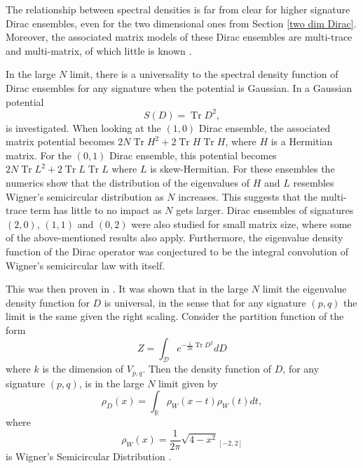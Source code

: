 \documentclass[10pt]{article}
\DeclareMathOperator{\tr}{Tr}
\begin{document}
The relationship between spectral densities is far from clear for higher signature Dirac ensembles, even for the two dimensional ones from Section \ref{two dim Dirac}. Moreover, the associated matrix models of these Dirac ensembles are multi-trace and multi-matrix, of which little is known \cite{Eynard combin}.

In the large $N$ limit, there is a  universality to the spectral density function of Dirac ensembles for any signature when the potential is Gaussian. In \cite{Barrett2015} a Gaussian potential 
\begin{equation*}
	S(D) = \tr D^{2},
\end{equation*} 
is investigated. When looking at the $(1,0)$ Dirac ensemble, the associated matrix potential becomes
$2N\tr H^{2} + 2 \tr H \tr H$, where $H$ is a Hermitian matrix. For  the $(0,1)$ Dirac ensemble, this potential becomes
$2N\tr L^{2} + 2 \tr L \tr L $ where $L$ is skew-Hermitian.
For these ensembles the numerics show that the distribution of the eigenvalues of  $H$  and $L$ resembles Wigner's semicircular distribution as $N$ increases. This suggests that the multi-trace term has little to no impact as $N$ gets larger.  
Dirac ensembles of signatures $(2,0)$, $(1,1)$ and $(0,2)$ were also studied for small matrix size, where some of the above-mentioned results also apply. 
Furthermore, the eigenvalue density function of the Dirac operator was conjectured to be the integral convolution of Wigner's semicircular law with itself. 

This was then proven in \cite{Second paper}. It was shown that in the large $N$ limit the eigenvalue density function for $D$ is universal, in the sense that for any signature $(p,q)$ the limit is the same given the right scaling.
Consider the partition function of the form
\begin{equation*}
	Z = \int_{\mathcal{D}}e^{-\frac{1}{2k}\tr D^{2}}dD
\end{equation*}
where $k$ is the dimension of $V_{p,q}$. Then the density function of $D$, for any signature $(p,q)$, is in the large $N$ limit given by
\begin{equation*}
	\rho_{D}(x) = \int_{\mathbb{R}}\rho_{W}(x-t)\rho_{W}(t)dt,
\end{equation*}
where
\begin{equation*}
	\rho_{W}(x) = \frac{1}{2\pi}\sqrt{4-x^{2}}_{[-2,2]} 
\end{equation*}
is Wigner's Semicircular Distribution \cite{Second paper}. %
\end{document}
